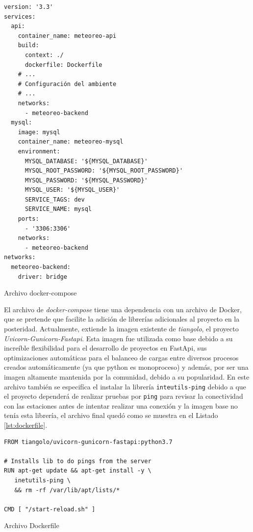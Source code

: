 \begin{listing}
\begin{verbatim}
version: '3.3'
services:
  api:
    container_name: meteoreo-api
    build:
      context: ./
      dockerfile: Dockerfile
    # ...
    # Configuración del ambiente
    # ...
    networks:
      - meteoreo-backend
  mysql:
    image: mysql
    container_name: meteoreo-mysql
    environment:
      MYSQL_DATABASE: '${MYSQL_DATABASE}'
      MYSQL_ROOT_PASSWORD: '${MYSQL_ROOT_PASSWORD}'
      MYSQL_PASSWORD: '${MYSQL_PASSWORD}'
      MYSQL_USER: '${MYSQL_USER}'
      SERVICE_TAGS: dev
      SERVICE_NAME: mysql
    ports:
      - '3306:3306'
    networks:
      - meteoreo-backend
networks:
  meteoreo-backend:
    driver: bridge
\end{verbatim}
\caption{Archivo docker-compose}
\label{lst:docker-compose}
\end{listing}

El archivo de \textit{docker-compose} tiene una dependencia con un archivo de Docker, que se pretende que facilite la adición de librerías adicionales al proyecto en la posteridad. Actualmente, extiende la imagen existente de \textit{tiangolo}, el proyecto \textit{Uvicorn-Gunicorn-Fastapi}. Esta imagen fue utilizada como base debido a su increíble flexibilidad para el desarrollo de proyectos en FastApi, sus optimizaciones automáticas para el balanceo de cargas entre diversos procesos creados automáticamente (ya que python es monoproceso) y además, por ser una imagen altamente mantenida por la comunidad, debido a su popularidad. En este archivo también se especifíca el instalar la librería \texttt{inteutils-ping} debido a que el proyecto dependerá de realizar pruebas por \texttt{ping} para revisar la conectividad con las estaciones antes de intentar realizar una conexión y la imagen base no tenía esta librería, el archivo final quedó como se muestra en el Listado \ref{lst:dockerfile}.


\begin{listing}[h]
\begin{verbatim}
FROM tiangolo/uvicorn-gunicorn-fastapi:python3.7

# Installs lib to do pings from the server
RUN apt-get update && apt-get install -y \
   inetutils-ping \
   && rm -rf /var/lib/apt/lists/*

CMD [ "/start-reload.sh" ]
\end{verbatim}
\caption[Dockerfile]{Archivo Dockerfile}
\label{lst:dockerfile}
\end{listing}

